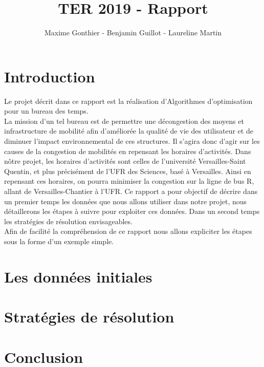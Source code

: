 \documentclass[a4paper,11pt]{article}
\title{TER 2019 - Rapport}
\author{Maxime Gonthier - Benjamin Guillot - Laureline Martin}
\begin{document}
\clearpage
\maketitle

\newpage
\tableofcontents

\newpage
\section{Introduction}
	Le projet décrit dans ce rapport est la réalisation d'Algorithmes d'optimisation pour un bureau des temps.\\
	La mission d'un tel bureau est de permettre une décongestion des moyens et infrastructure de mobilité afin d'améliorée la qualité de vie des utilisateur et de diminuer l'impact environnemental de ces structures.
	Il s'agira donc d'agir sur les causes de la congestion de mobilités en repensant les horaires d'activités.
	Dans nôtre projet, les horaires d'activités sont celles de l'université Versailles-Saint Quentin, et plus précisément de l'UFR des Sciences, basé à Versailles. Ainsi en repensant ces horaires, on pourra minimiser la congestion sur la ligne de bus R, allant de Versailles-Chantier à l'UFR.
	Ce rapport a pour objectif de décrire dans un premier temps les données que nous allons utiliser dans notre projet, nous détaillerons les étapes à suivre pour exploiter ces données. Dans un second temps les stratégies de résolution envisageables.\\
	Afin de facilité la compréhension de ce rapport nous allons expliciter les étapes sous la forme d'un exemple simple.
\section{Les données initiales}
\section{Stratégies de résolution}
\section{Conclusion}
\end{document}
